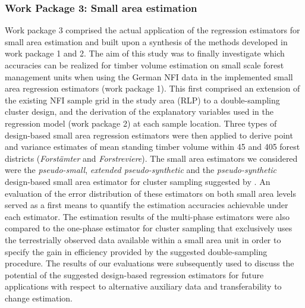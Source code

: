 
\subsubsection{Work Package 3: Small area estimation} %


Work package 3 comprised the actual application of the regression estimators for small area estimation and built upon a synthesis of the methods developed in work package 1 and 2. The aim of this study was to finally investigate which accuracies can be realized for timber volume estimation on small scale forest management units when using the German NFI data in the implemented small area regression estimators (work package 1). This first comprised an extension of the existing NFI sample grid in the study area (RLP) to a double-sampling cluster design, and the derivation of the explanatory variables used in the regression model (work package 2) at each sample location. Three types of design-based small area regression estimators were then applied to derive point and variance estimates of mean standing timber volume within 45 and 405 forest districts (\textit{Forst{\"a}mter} and \textit{Forstreviere}). The small area estimators we considered were the \textit{pseudo-small}, \textit{extended pseudo-synthetic} and the \textit{pseudo-synthetic} design-based small area estimator for cluster sampling suggested by \citet{mandallaz2013a, mandallaz2013b}. An evaluation of the error distribution of these estimators on both small area levels served as a first means to quantify the estimation accuracies achievable under each estimator. The estimation results of the multi-phase estimators were also compared to the one-phase estimator for cluster sampling that exclusively uses the terrestrially observed data available within a small area unit in order to specify the gain in efficiency provided by the suggested double-sampling procedure. The results of our evaluations were subsequently used to discuss the potential of the suggested design-based regression estimators for future applications with respect to alternative auxiliary data and transferability to change estimation.

